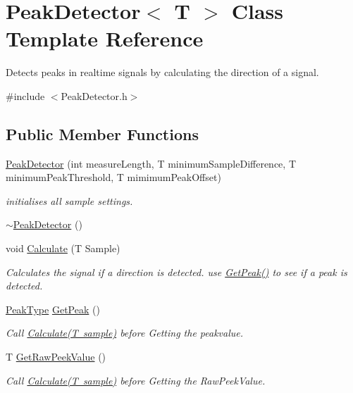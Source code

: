 \hypertarget{class_peak_detector}{}\section{Peak\+Detector$<$ T $>$ Class Template Reference}
\label{class_peak_detector}


Detects peaks in realtime signals by calculating the direction of a signal.  




{\ttfamily \#include $<$Peak\+Detector.\+h$>$}

\subsection*{Public Member Functions}
\begin{DoxyCompactItemize}
\item 
\mbox{\hyperlink{class_peak_detector_a616829654acf46b8574903d9abcdaf9d}{Peak\+Detector}} (int measure\+Length, T minimum\+Sample\+Difference, T minimum\+Peak\+Threshold, T mimimum\+Peak\+Offset)
\begin{DoxyCompactList}\small\item\em initialises all sample settings. \end{DoxyCompactList}\item 
\mbox{\hyperlink{class_peak_detector_a950c3287299cf1352cb7c32de2f54384}{$\sim$\+Peak\+Detector}} ()
\item 
void \mbox{\hyperlink{class_peak_detector_a888b9d29612caf03e7417ab3593f6392}{Calculate}} (T Sample)
\begin{DoxyCompactList}\small\item\em Calculates the signal if a direction is detected. use \mbox{\hyperlink{class_peak_detector_a72f7916aa1d26388c9d70eee1cd5e3bc}{Get\+Peak()}} to see if a peak is detected. \end{DoxyCompactList}\item 
\mbox{\hyperlink{_peak_detector_8h_a4791e14c9f62a95fdf58cd8b41ca6a08}{Peak\+Type}} \mbox{\hyperlink{class_peak_detector_a72f7916aa1d26388c9d70eee1cd5e3bc}{Get\+Peak}} ()
\begin{DoxyCompactList}\small\item\em Call \mbox{\hyperlink{class_peak_detector_a888b9d29612caf03e7417ab3593f6392}{Calculate(\+T sample)}} before Getting the peakvalue. \end{DoxyCompactList}\item 
T \mbox{\hyperlink{class_peak_detector_aebfc5583c4c696119bbe834b1474d896}{Get\+Raw\+Peek\+Value}} ()
\begin{DoxyCompactList}\small\item\em Call \mbox{\hyperlink{class_peak_detector_a888b9d29612caf03e7417ab3593f6392}{Calculate(\+T sample)}} before Getting the Raw\+Peek\+Value. \end{DoxyCompactList}\end{DoxyCompactItemize}



